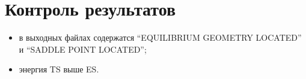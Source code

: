 \section{Контроль результатов}
\begin{itemize}
    \item в выходных файлах содержатся “EQUILIBRIUM GEOMETRY LOCATED” и “SADDLE POINT LOCATED”;
    \item энергия TS выше ES.
\end{itemize}{}